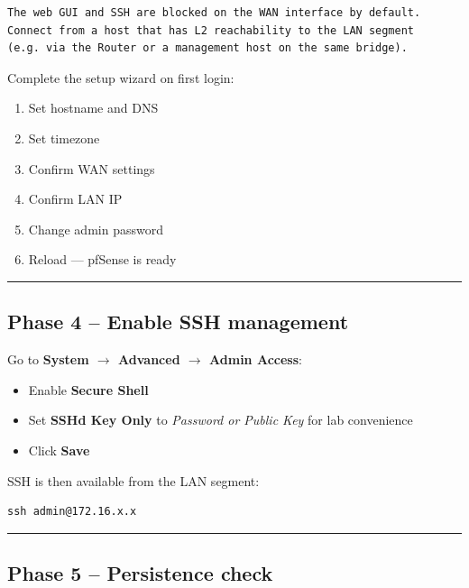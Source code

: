 \begin{lstlisting}
The web GUI and SSH are blocked on the WAN interface by default.
Connect from a host that has L2 reachability to the LAN segment
(e.g. via the Router or a management host on the same bridge).
\end{lstlisting}

Complete the setup wizard on first login:

\begin{enumerate}
\def\labelenumi{\arabic{enumi}.}
\tightlist
\item
  Set hostname and DNS
\item
  Set timezone
\item
  Confirm WAN settings
\item
  Confirm LAN IP
\item
  Change admin password
\item
  Reload --- pfSense is ready
\end{enumerate}

\begin{center}\rule{0.5\linewidth}{0.5pt}\end{center}

\subsection{Phase 4 -- Enable SSH management}

Go to \textbf{System $\rightarrow$ Advanced $\rightarrow$ Admin Access}:

\begin{itemize}
\tightlist
\item
  Enable \textbf{Secure Shell}
\item
  Set \textbf{SSHd Key Only} to \emph{Password or Public Key} for lab convenience
\item
  Click \textbf{Save}
\end{itemize}

SSH is then available from the LAN segment:

\begin{lstlisting}
ssh admin@172.16.x.x
\end{lstlisting}

\begin{center}\rule{0.5\linewidth}{0.5pt}\end{center}

\subsection{Phase 5 -- Persistence check}

